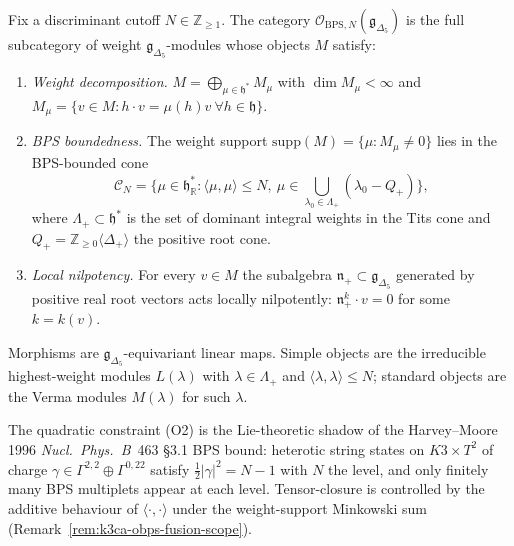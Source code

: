 \begin{definition}
\label{def:k3ca-obps-bps-bounded}
Fix a discriminant cutoff $N\in\mathbb Z_{\geq 1}$. The category
$\mathcal{O}_{\mathrm{BPS},N}(\mathfrak g_{\Delta_5})$ is the full
subcategory of weight $\mathfrak g_{\Delta_5}$-modules whose objects
$M$ satisfy:
\begin{enumerate}[label=\textup{(O\arabic*)}]
\item \emph{Weight decomposition.}
$M = \bigoplus_{\mu\in\mathfrak h^*} M_\mu$ with
$\dim M_\mu < \infty$ and
$M_\mu = \{v\in M : h\cdot v = \mu(h)v\ \forall h\in\mathfrak h\}$.
\item \emph{BPS boundedness.} The weight support
$\mathrm{supp}(M) = \{\mu : M_\mu\neq 0\}$ lies in the BPS-bounded cone
\begin{equation}
\label{eq:k3ca-obps-cone}
\mathcal{C}_N
 = \bigl\{\mu\in\mathfrak h^*_{\mathbb R} :
 \langle\mu,\mu\rangle \leq N,\
 \mu\in\textstyle\bigcup_{\lambda_0\in\Lambda_+}
 (\lambda_0 - Q_+)\bigr\},
\end{equation}
where $\Lambda_+\subset\mathfrak h^*$ is the set of dominant
integral weights in the Tits cone and
$Q_+ = \mathbb Z_{\geq 0}\langle\Delta_+\rangle$ the positive root
cone.
\item \emph{Local nilpotency.} For every $v\in M$ the subalgebra
$\mathfrak n_+\subset\mathfrak g_{\Delta_5}$ generated by positive
real root vectors acts locally nilpotently:
$\mathfrak n_+^k\cdot v = 0$ for some $k=k(v)$.
\end{enumerate}
Morphisms are $\mathfrak g_{\Delta_5}$-equivariant linear maps.
Simple objects are the irreducible highest-weight modules
$L(\lambda)$ with $\lambda\in\Lambda_+$ and
$\langle\lambda,\lambda\rangle\leq N$; standard objects are the
Verma modules $M(\lambda)$ for such $\lambda$.
\end{definition}

The quadratic constraint (O2) is the Lie-theoretic shadow of the
Harvey--Moore 1996 \emph{Nucl.\ Phys.\ B}~463 \S3.1 BPS bound:
heterotic string states on $K3\times T^2$ of charge
$\gamma\in\Gamma^{2,2}\oplus\Gamma^{0,22}$ satisfy
$\tfrac{1}{2}|\gamma|^2 = N-1$ with $N$ the level, and only
finitely many BPS multiplets appear at each level. Tensor-closure
is controlled by the additive behaviour of
$\langle\cdot,\cdot\rangle$ under the weight-support Minkowski sum
(Remark~\ref{rem:k3ca-obps-fusion-scope}).

